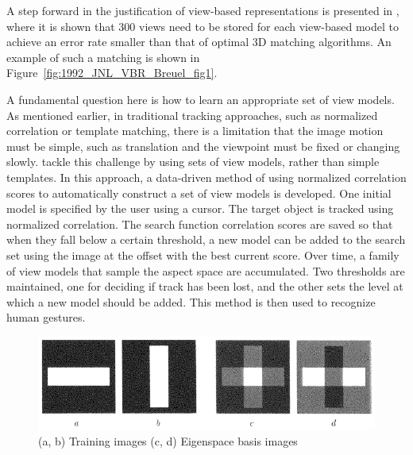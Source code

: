 \begin{Body}
A step forward in the justification of view-based representations is presented in  \cite{1992_JNL_VBR_Breuel}, where it is shown that 300 views need to be stored for each view-based model to achieve an error rate smaller than that of optimal 3D matching algorithms.  An example of such a matching is shown in Figure~\ref{fig:1992_JNL_VBR_Breuel_fig1}.%

A fundamental question here is how to learn an appropriate set of view models.  As mentioned earlier, in traditional tracking approaches, such as normalized correlation or template matching, there is a limitation that the image motion must be simple, such as translation and the viewpoint must be fixed or changing slowly.  \cite{1993_CNF_Gestures_Darrell} tackle this challenge by using sets of view models, rather than simple templates.  In this approach, a data-driven method of using normalized correlation scores to automatically construct a set of view models is developed.  One initial model is specified by the user using a cursor.  The target object is tracked using normalized correlation.  The search function correlation scores are saved so that when they fall below a certain threshold, a new model can be added to the search set using the image at the offset with the best current score.  Over time, a family of view models that sample the aspect space are accumulated.  Two thresholds are maintained, one for deciding if track has been lost, and the other sets the level at which a new model should be added.  This method is then used to recognize human gestures.

								\begin{figure}[t]
								\center
								\includegraphics[width=1.0\textwidth]{thesis/TrackingPapers_SubspaceTracking_1998_Black_fig2_nocaption.png}
								\caption{(a, b) Training images (c, d) Eigenspace basis images \cite{1998_JNL_Eigentracking_Black}}
								\end{figure}



\end{Body}
